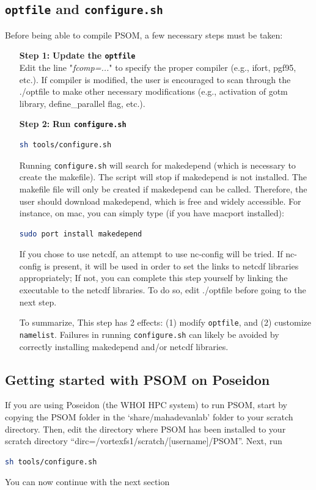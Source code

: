 \documentclass[12pt,letterpaper,titlepage]{article}
\begin{document}
\subsection{\texttt{optfile} and \texttt{configure.sh}}

Before being able to compile PSOM, a few necessary steps must be taken:

\begin{itemize}
	\item[\textbf{Step 1:}] \textbf{Update the \texttt{optfile}}\\
	Edit the line "\textit{fcomp=...}" to specify the proper compiler (e.g., ifort, pgf95, etc.). If compiler is modified, the user is encouraged to scan through the ./optfile to make other necessary modifications (e.g., activation of gotm library, define\_parallel flag, etc.).
	
	\item[\textbf{Step 2:}] \textbf{Run \texttt{configure.sh}}
\begin{lstlisting}[language=sh, breaklines]
		sh tools/configure.sh
\end{lstlisting}
Running \texttt{configure.sh} will search for makedepend (which is necessary to create the makefile). The script will stop if makedepend is not installed. The makefile file will only be created if makedepend can be called. Therefore, the user should download makedepend, which is free and widely accessible. For instance, on mac, you can simply type (if you have macport installed):
\begin{lstlisting}[language=sh, breaklines]
 sudo port install makedepend
\end{lstlisting}
If you chose to use netcdf, an attempt to use nc-config will be tried. If nc-config is present, it will be used in order to set the links to netcdf libraries appropriately; If not, you can complete this step yourself by linking the executable to the netcdf libraries. To do so, edit ./optfile before going to the next step.

To summarize, This step has 2 effects: (1) modify \texttt{optfile}, and (2) customize \texttt{namelist}. Failures in running \texttt{configure.sh} can likely be avoided by correctly installing makedepend and/or netcdf libraries.

\end{itemize}

\subsection{Getting started with PSOM on Poseidon}
If you are using Poseidon (the WHOI HPC system) to run PSOM, start by copying the PSOM folder in the `share/mahadevanlab' folder to your scratch directory. Then, edit the directory where PSOM has been installed to your scratch directory ``dirc=/vortexfs1/scratch/[username]/PSOM''. Next, run
\begin{lstlisting}[language=sh, breaklines]
		sh tools/configure.sh
\end{lstlisting}
You can now continue with the next section
\end{document}
